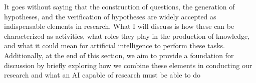 It goes without saying that the construction of questions, the generation of hypotheses, and the verification of hypotheses are widely accepted as indispensable elements in research. What I will discuss is how these can be characterized as activities, what roles they play in the production of knowledge, and what it could mean for artificial intelligence to perform these tasks. Additionally, at the end of this section, we aim to provide a foundation for discussion by briefly exploring how we combine these elements in conducting our research and what an AI capable of research must be able to do








